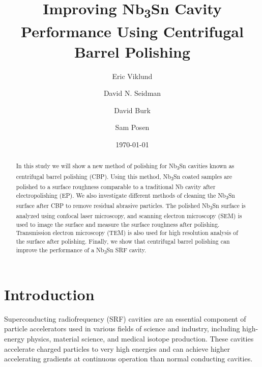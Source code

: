 \documentclass[reprint,amsmath,amssymb,aps]{revtex4-2}%
\begin{document}
%
\normalsize%
\title{Improving Nb\textsubscript{3}Sn Cavity Performance Using Centrifugal Barrel Polishing}%
\author{Eric Viklund}%
%
%
\author{David N. Seidman}%
%
\author{David Burk}%
%
\author{Sam Posen}%
%
\date{\today}%

\begin{abstract}%
In this study we will show a new method of polishing for Nb\textsubscript{3}Sn cavities known as centrifugal barrel polishing (CBP). Using this method, Nb\textsubscript{3}Sn coated samples are polished to a surface roughness comparable to a traditional Nb cavity after electropolishing (EP). We also investigate different methods of cleaning the Nb\textsubscript{3}Sn surface after CBP to remove residual abrasive particles. The polished Nb\textsubscript{3}Sn surface is analyzed using confocal laser microscopy, and scanning electron microscopy (SEM) is used to image the surface and measure the surface roughness after polishing. Transmission electron microscopy (TEM) is also used for high resolution analysis of the surface after polishing. Finally, we show that centrifugal barrel polishing can improve the performance of a Nb\textsubscript{3}Sn SRF cavity.
%
\end{abstract}%

\maketitle%

\section{Introduction}%
\label{sec:Introduction}%
Superconducting radiofrequency (SRF) cavities are an essential component of particle accelerators used in various fields of science and industry, including high-energy physics, material science, and medical isotope production\cite{boulware2019high}. These cavities accelerate charged particles to very high energies and can achieve higher accelerating gradients at continuous operation than normal conducting cavities.
\end{document}
